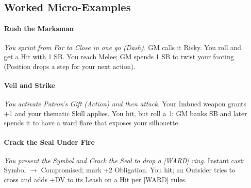 \subsection{Worked Micro-Examples}
\paragraph{Rush the Marksman}
\emph{You sprint from Far to Close in one go (Dash).} GM calls it Risky. You roll and get a Hit with 1 SB. You reach Melee; GM spends 1 SB to twist your footing (Position drops a step for your next action).

\paragraph{Veil and Strike}
\emph{You activate Patron’s Gift (Action) and then attack.} Your Imbued weapon grants +1 and your thematic Skill applies. You hit, but roll a 1: GM banks SB and later spends it to have a ward flare that exposes your silhouette.

\paragraph{Crack the Seal Under Fire}
\emph{You present the Symbol and Crack the Seal to drop a [WARD] ring.} Instant cast: Symbol $\rightarrow$ Compromised; mark +2 Obligation. You hit; an Outsider tries to cross and adds +DV to its Leash on a Hit per [WARD] rules.
